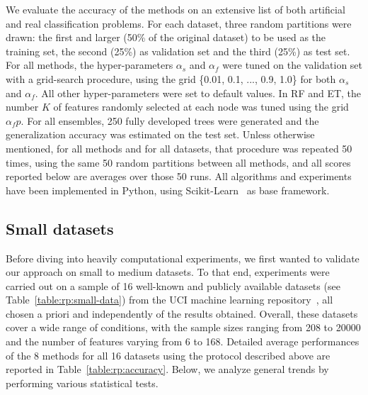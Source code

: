 We evaluate the accuracy of the methods on an extensive list of both
artificial and real classification problems.  For each dataset, three
random partitions were drawn: the first and larger (50\% of the
original dataset) to be used as the training set, the second (25\%) as
validation set and the third (25\%) as test set. For all methods, the
hyper-parameters $\alpha_s$ and $\alpha_f$ were tuned on the validation set with
a grid-search procedure, using the grid \{0.01, 0.1, ..., 0.9, 1.0\}
for both $\alpha_s$ and $\alpha_f$. All other hyper-parameters were set to
default values. In RF and ET, the number $K$ of features randomly
selected at each node was tuned using the grid $\alpha_f p$. For all
ensembles, 250 fully developed trees were generated and the
generalization accuracy was estimated on the test set. Unless
otherwise mentioned, for all methods and for all datasets, that
procedure was repeated 50 times, using the same 50 random partitions
between all methods, and all scores reported below are averages over
those 50 runs. All algorithms and experiments have been implemented in
Python, using Scikit-Learn~\citep{pedregosa:2011} as base framework.

\subsection{Small datasets}

Before diving into heavily computational experiments, we first wanted to
validate our approach on small to medium datasets. To that end, experiments
were carried out on a sample of 16 well-known and publicly
available datasets (see Table~\ref{table:rp:small-data}) from the UCI machine
learning repository~\citep{frank:2010}, all chosen a priori and
independently of the results obtained. Overall, these datasets cover a wide
range of conditions, with the sample sizes ranging from 208 to 20000 and the
number of features varying from 6 to 168. Detailed average performances of the
8 methods for all 16 datasets using the protocol described above are reported
in Table~\ref{table:rp:accuracy}. Below, we analyze general trends by performing
various statistical tests.


